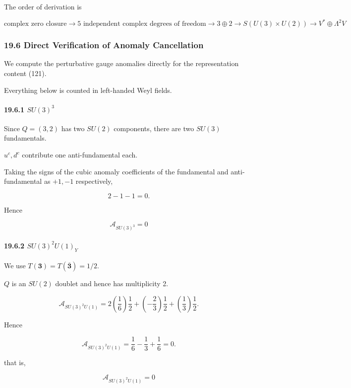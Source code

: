 \documentclass[
  a4paper,
]{article}
\begin{document}
The order of derivation is

\[
\boxed{
\text{complex zero closure}
\to
5\text{ independent complex degrees of freedom}
\to
3\oplus2
\to
S(U(3)\times U(2))
\to
V^*\oplus\Lambda^2V
}
\tag{124}
\]

\subsubsection{19.6 Direct Verification of Anomaly
Cancellation}\label{direct-verification-of-anomaly-cancellation}

We compute the perturbative gauge anomalies directly for the
representation content (121).

Everything below is counted in left-handed Weyl fields.

\paragraph{\texorpdfstring{19.6.1
\(SU(3)^3\)}{19.6.1 SU(3)\^{}3}}\label{su33}

Since \(Q=(3,2)\) has two \(SU(2)\) components, there are two \(SU(3)\)
fundamentals.

\(u^c,d^c\) contribute one anti-fundamental each.

Taking the signs of the cubic anomaly coefficients of the fundamental
and anti-fundamental as \(+1,-1\) respectively,

\[
2-1-1=0.
\]

Hence

\[
\boxed{
\mathcal A_{SU(3)^3}=0
}
\tag{125}
\]

\paragraph{\texorpdfstring{19.6.2
\(SU(3)^2U(1)_Y\)}{19.6.2 SU(3)\^{}2U(1)\_Y}}\label{su32u1_y}

We use \(T(\mathbf3)=T(\overline{\mathbf3})=1/2\).

\(Q\) is an \(SU(2)\) doublet and hence has multiplicity 2.

\[
\mathcal A_{SU(3)^2U(1)}
=
2\left(\frac16\right)\frac12
+
\left(-\frac23\right)\frac12
+
\left(\frac13\right)\frac12.
\]

Hence

\[
\mathcal A_{SU(3)^2U(1)}
=
\frac16-\frac13+\frac16
=
0.
\]

that is,

\[
\boxed{
\mathcal A_{SU(3)^2U(1)}=0
}
\tag{126}
\]
\end{document}
